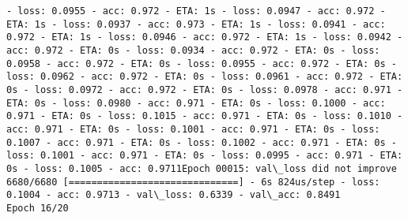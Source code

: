 \documentclass[11pt]{article}
\begin{document}
\begin{Verbatim}[commandchars=\\\{\}]
- loss: 0.0955 - acc: 0.972 - ETA: 1s - loss: 0.0947 - acc: 0.972 - ETA: 1s - loss: 0.0937 - acc: 0.973 - ETA: 1s - loss: 0.0941 - acc: 0.972 - ETA: 1s - loss: 0.0946 - acc: 0.972 - ETA: 1s - loss: 0.0942 - acc: 0.972 - ETA: 0s - loss: 0.0934 - acc: 0.972 - ETA: 0s - loss: 0.0958 - acc: 0.972 - ETA: 0s - loss: 0.0955 - acc: 0.972 - ETA: 0s - loss: 0.0962 - acc: 0.972 - ETA: 0s - loss: 0.0961 - acc: 0.972 - ETA: 0s - loss: 0.0972 - acc: 0.972 - ETA: 0s - loss: 0.0978 - acc: 0.971 - ETA: 0s - loss: 0.0980 - acc: 0.971 - ETA: 0s - loss: 0.1000 - acc: 0.971 - ETA: 0s - loss: 0.1015 - acc: 0.971 - ETA: 0s - loss: 0.1010 - acc: 0.971 - ETA: 0s - loss: 0.1001 - acc: 0.971 - ETA: 0s - loss: 0.1007 - acc: 0.971 - ETA: 0s - loss: 0.1002 - acc: 0.971 - ETA: 0s - loss: 0.1001 - acc: 0.971 - ETA: 0s - loss: 0.0995 - acc: 0.971 - ETA: 0s - loss: 0.1005 - acc: 0.9711Epoch 00015: val\_loss did not improve
6680/6680 [==============================] - 6s 824us/step - loss: 0.1004 - acc: 0.9713 - val\_loss: 0.6339 - val\_acc: 0.8491
Epoch 16/20

\end{Verbatim}
\end{document}
